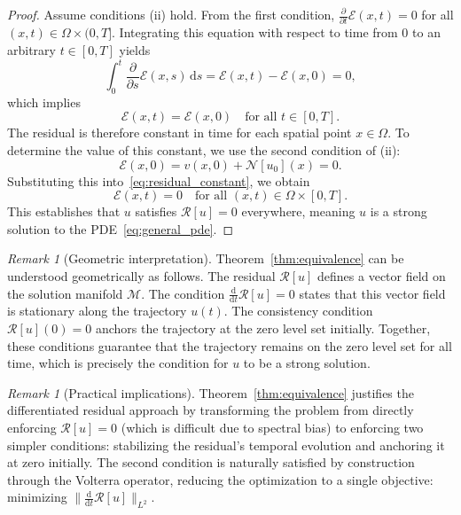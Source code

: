 \documentclass[11pt,reqno]{amsart}
\theoremstyle{plain}
\theoremstyle{definition}
\theoremstyle{remark}
\newtheorem{remark}[theorem]{Remark}
\begin{document}
\begin{proof}
\noindent Assume conditions (ii) hold. From the first condition, $\frac{\partial}{\partial t} \mathcal{E}(x,t) = 0$ for all $(x,t) \in \Omega \times (0,T]$. Integrating this equation with respect to time from $0$ to an arbitrary $t \in [0,T]$ yields
\begin{equation}
    \int_0^t \frac{\partial}{\partial s} \mathcal{E}(x,s) \, \mathrm{d}s = \mathcal{E}(x,t) - \mathcal{E}(x,0) = 0,
\end{equation}
which implies
\begin{equation}\label{eq:residual_constant}
    \mathcal{E}(x,t) = \mathcal{E}(x,0) \quad \text{for all } t \in [0,T].
\end{equation}
The residual is therefore constant in time for each spatial point $x \in \Omega$. To determine the value of this constant, we use the second condition of (ii):
\begin{equation}
    \mathcal{E}(x,0) = v(x,0) + \mathcal{N}[u_0](x) = 0.
\end{equation}
Substituting this into~\eqref{eq:residual_constant}, we obtain
\begin{equation}
    \mathcal{E}(x,t) = 0 \quad \text{for all } (x,t) \in \Omega \times [0,T].
\end{equation}
This establishes that $u$ satisfies $\mathcal{R}[u] = 0$ everywhere, meaning $u$ is a strong solution to the PDE~\eqref{eq:general_pde}.
\end{proof}

\begin{remark}[Geometric interpretation]
Theorem~\ref{thm:equivalence} can be understood geometrically as follows. The residual $\mathcal{R}[u]$ defines a vector field on the solution manifold $\mathcal{M}$. The condition $\displaystyle \frac{\mathrm{d}}{\mathrm{d}t}\mathcal{R}[u] = 0$ states that this vector field is stationary along the trajectory $u(t)$. The consistency condition $\mathcal{R}[u](0) = 0$ anchors the trajectory at the zero level set initially. Together, these conditions guarantee that the trajectory remains on the zero level set for all time, which is precisely the condition for $u$ to be a strong solution.
\end{remark}

\begin{remark}[Practical implications]
Theorem~\ref{thm:equivalence} justifies the differentiated residual approach by transforming the problem from directly enforcing $\mathcal{R}[u] = 0$ (which is difficult due to spectral bias) to enforcing two simpler conditions: stabilizing the residual's temporal evolution and anchoring it at zero initially. The second condition is naturally satisfied by construction through the Volterra operator, reducing the optimization to a single objective: minimizing $\|\frac{\mathrm{d}}{\mathrm{d}t}\mathcal{R}[u]\|_{L^2}$.
\end{remark}
\end{document}
